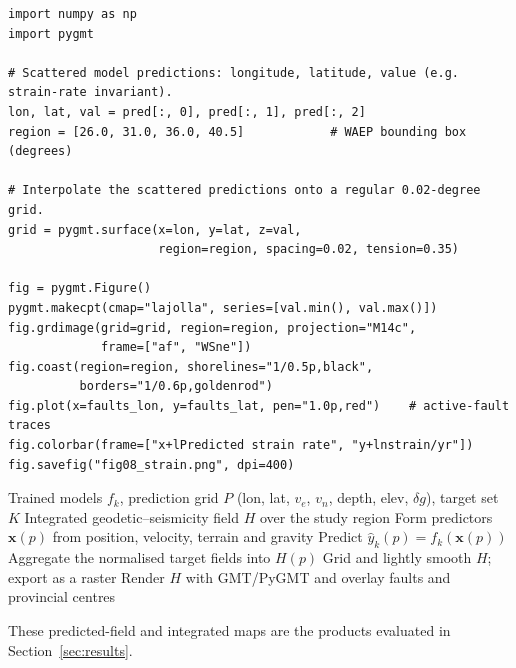 \documentclass[pdflatex,sn-mathphys-num]{sn-jnl}%
\theoremstyle{thmstyleone}%
\theoremstyle{thmstyletwo}%
\theoremstyle{thmstylethree}%
\begin{document}
\begin{lstlisting}[style=py,caption={PyGMT routine that interpolates a predicted geodetic/gravimetric field onto a regular grid and renders it as a map.},label={lst:pygmt}]
import numpy as np
import pygmt

# Scattered model predictions: longitude, latitude, value (e.g. strain-rate invariant).
lon, lat, val = pred[:, 0], pred[:, 1], pred[:, 2]
region = [26.0, 31.0, 36.0, 40.5]            # WAEP bounding box (degrees)

# Interpolate the scattered predictions onto a regular 0.02-degree grid.
grid = pygmt.surface(x=lon, y=lat, z=val,
                     region=region, spacing=0.02, tension=0.35)

fig = pygmt.Figure()
pygmt.makecpt(cmap="lajolla", series=[val.min(), val.max()])
fig.grdimage(grid=grid, region=region, projection="M14c",
             frame=["af", "WSne"])
fig.coast(region=region, shorelines="1/0.5p,black",
          borders="1/0.6p,goldenrod")
fig.plot(x=faults_lon, y=faults_lat, pen="1.0p,red")    # active-fault traces
fig.colorbar(frame=["x+lPredicted strain rate", "y+lnstrain/yr"])
fig.savefig("fig08_strain.png", dpi=400)
\end{lstlisting}

\begin{algorithm}
\caption{Computation of the integrated geodetic--seismicity field from model predictions.}\label{alg:hazard}
\begin{algorithmic}[1]
\Require Trained models $f_k$, prediction grid $P$ (lon, lat, $v_e$, $v_n$, depth, elev, $\delta g$), target set $K$
\Ensure Integrated geodetic--seismicity field $H$ over the study region
    \State Form predictors $\mathbf{x}(p)$ from position, velocity, terrain and gravity
    \State Predict $\hat{y}_k(p) = f_k(\mathbf{x}(p))$
  \EndFor
  \State Aggregate the normalised target fields into $H(p)$
\EndFor
\State Grid and lightly smooth $H$; export as a raster
\State Render $H$ with GMT/PyGMT and overlay faults and provincial centres
\end{algorithmic}
\end{algorithm}

These predicted-field and integrated maps are the products evaluated in
Section~\ref{sec:results}.
\end{document}

